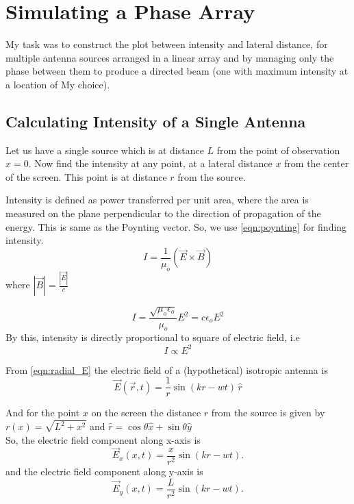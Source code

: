 \chapter{Simulating a Phase Array}


My task was to construct the plot between intensity and lateral distance, for multiple antenna sources arranged in a linear array and by managing only the phase between them to produce a directed beam (one with maximum intensity at a location of My choice).

\section{Calculating Intensity of a Single Antenna}

Let us have a single source which is at distance $L$ from the point of observation $x = 0$. Now find the intensity at any point, at a lateral distance $x$ from the center of the screen. This point is at distance $r$ from the source.

Intensity is defined as power transferred per unit area, where the area is measured on the plane perpendicular to the direction of propagation of the energy. This is same as the Poynting vector. So, we use \eqref{eqn:poynting} for finding intensity.
%
\begin{equation}
   I = \frac{1}{\mu_{o}}(\vec{E}\times\vec{B})
\end{equation}
%
where $\displaystyle |\vec{B}| = \frac{|\vec{E}|}{c}$

\begin{equation}
      I = \frac{\sqrt{\mu_{o}{\epsilon_{o}}}}{\mu_{o}}E^2 
        = c\epsilon_{o}E^2
\end{equation}
%
By this, intensity is directly proportional to square of electric field, i.e
%
\begin{equation}
   I \propto E^2
\end{equation}

From \eqref{eqn:radial_E} the electric field of a (hypothetical) isotropic antenna is
%
\begin{equation}
   \vec{E}(\vec{r},t) = \frac{1}{r}\sin(kr-wt) \, \hat{r}
\end{equation}

And for the point $x$ on the screen the distance $r$ from the source is given by $r(x) = \sqrt{L^2+x^2}$ and $\hat{r} = \cos\theta\hat{x}+\sin\theta\hat{y}$\\

So, the electric field component along x-axis is
%
\begin{equation}
\vec{E}_x(x,t) = \frac{x}{r^2}\sin(kr-wt).
\end{equation}
%
and the electric field component along y-axis is
%
\begin{equation}
\vec{E}_y(x,t) = \frac{L}{r^2}\sin(kr-wt).
\end{equation}

